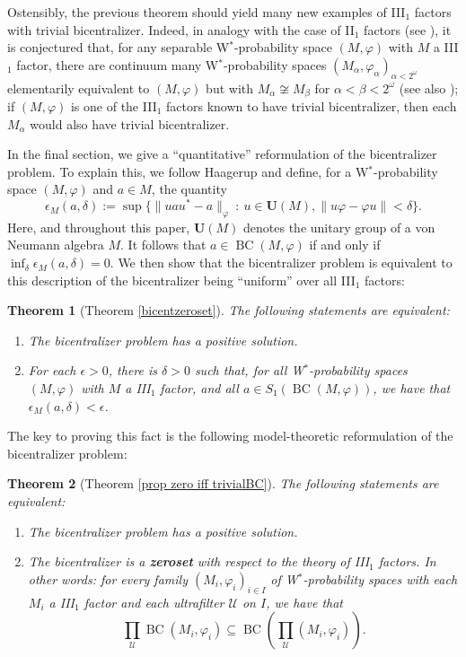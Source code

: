 \documentclass[12pt]{amsart}
\newtheorem*{thm*}{Theorem}
\theoremstyle{definition}
\def\u{\mathsf 1}
\def \u{\mathcal U}
\def\BC{\operatorname{BC}}
\begin{document}
Ostensibly, the previous theorem should yield many new examples of III$_1$ factors with trivial bicentralizer.  Indeed, in analogy with the case of II$_1$ factors (see \cite[Theorem 4.3]{farah2014model}), it is conjectured that, for any separable W$^*$-probability space $(M,\varphi)$ with $M$ a III$_1$ factor, there are continuum many W$^*$-probability spaces $(M_\alpha,\varphi_\alpha)_{\alpha<2^\omega}$ elementarily equivalent to $(M,\varphi)$ but with $M_\alpha\not\cong M_\beta$ for $\alpha<\beta<2^{\omega}$ (see also \cite[Question 4.13]{goldbringhoudayer}); if $(M,\varphi)$ is one of the III$_1$ factors known to have trivial bicentralizer, then each $M_\alpha$ would also have trivial bicentralizer.

In the final section, we give a ``quantitative'' reformulation of the bicentralizer problem.  To explain this, we follow Haagerup and define, for a W$^*$-probability space $(M,\varphi)$ and $a\in M$, the quantity $$\epsilon_M(a,\delta):=\sup\{\|uau^*-a\|_\varphi \ : \ u\in \mathbf{U}(M), \|u\varphi-\varphi u\|<\delta\}.$$  Here, and throughout this paper, $\mathbf{U}(M)$ denotes the unitary group of a von Neumann algebra $M$.  It follows that $a\in \BC(M,\varphi)$ if and only if $\inf_\delta \epsilon_M(a,\delta)=0$.  We then show that the bicentralizer problem is equivalent to this description of the bicentralizer being ``uniform'' over all III$_1$ factors:  

\begin{thm*}[Theorem \ref{bicentzeroset}]
The following statements are equivalent:
\begin{enumerate}
    \item The bicentralizer problem has a positive solution.
    \item For each $\epsilon>0$, there is $\delta>0$ such that, for all W$^*$-probability spaces $(M,\varphi)$ with $M$ a III$_1$ factor, and all $a\in S_1(\BC(M,\varphi))$, we have that $\epsilon_M(a,\delta)<\epsilon$.
\end{enumerate}
\end{thm*}

The key to proving this fact is the following model-theoretic reformulation of the bicentralizer problem:

\begin{thm*}[Theorem \ref{prop zero iff trivialBC}]
The following statements are equivalent:
\begin{enumerate}
    \item The bicentralizer problem has a positive solution.
    \item The bicentralizer is a \textbf{zeroset} with respect to the theory of III$_1$ factors.  In other words:  for every family $(M_i,\varphi_i)_{i\in I}$ of W$^*$-probability spaces with each $M_i$ a III$_1$ factor and each ultrafilter $\u$ on $I$, we have that 
    $$\prod_\u \BC(M_i,\varphi_i)\subseteq \BC\left(\prod_\u (M_i,\varphi_i)\right).$$
\end{enumerate}
\end{thm*}
\end{document}

